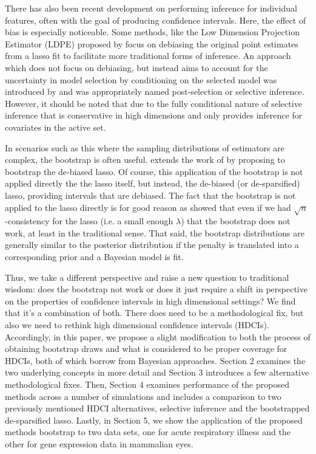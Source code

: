 There has also been recent development on performing inference for individual features, often with the goal of producing confidence intervals. Here, the effect of bias is especially noticeable. Some methods, like the Low Dimension Projection Estimator (LDPE) proposed by \cite{ZhangZhang2014} focus on debiasing the original point estimates from a lasso fit to facilitate more traditional forms of inference. An approach which does not focus on debiasing, but instead aims to account for the uncertainty in model selection by conditioning on the selected model was introduced by \cite{LeeEtAl2016} and was appropriately named post-selection or selective inference. However, it should be noted that due to the fully conditional nature of selective inference that is conservative in high dimensions and only provides inference for covariates in the active set.

In scenarios such as this where the sampling distributions of estimators are complex, the bootstrap is often useful. \cite{Dezeure2017} extends the work of \cite{ZhangZhang2014} by proposing to bootstrap the de-biased lasso. Of course, this application of the bootstrap is not applied directly the the lasso itself, but instead, the de-biased (or de-sparsified) lasso, providing intervals that are debiased. The fact that the bootstrap is not applied to the lasso directly is for good reason as \cite{Chatterjee2010} showed that even if we had $\sqrt{n}$-consistency for the lasso (i.e. a small enough $\lambda$) that the bootstrap does not work, at least in the traditional sense. That said, the bootstrap distributions are generally similar to the posterior distribution if the penalty is translated into a corresponding prior and a Bayesian model is fit.

Thus, we take a different perspective and raise a new question to traditional wisdom: does the bootstrap not work or does it just require a shift in perspective on the properties of confidence intervals in high dimensional settings? We find that it's a combination of both. There does need to be a methodological fix, but also we need to rethink high dimensional confidence intervals (HDCIs). Accordingly, in this paper, we propose a slight modification to both the process of obtaining bootstrap draws and what is considered to be proper coverage for HDCIs, both of which borrow from Bayesian approaches. Section 2 examines the two underlying concepts in more detail and Section 3 introduces a few alternative methodological fixes. Then, Section 4 examines performance of the proposed methods across a number of simulations and includes a comparison to two previously mentioned HDCI alternatives, selective inference and the bootstrapped de-sparsified lasso. Lastly, in Section 5, we show the application of the proposed methods bootstrap to two data sets, one for acute respiratory illness and the other for gene expression data in mammalian eyes.

